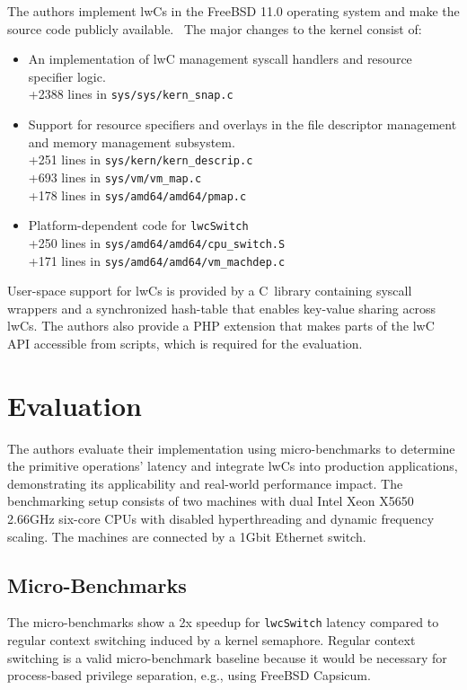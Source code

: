 \documentclass[10pt,twocolumn,a4paper]{article}
\begin{document}
The authors implement lwCs in the FreeBSD 11.0 operating system and make the source code publicly available.~\cite{lwckernelrepo,lwclibsrepo} %
The major changes to the kernel consist of:
\begin{itemize}[nosep]
  \item An implementation of lwC management syscall handlers and resource specifier logic.\\
  +2388 lines in \texttt{sys/sys/kern\_snap.c}
  \item Support for resource specifiers and overlays in the file descriptor management and memory management subsystem.\\
  +251 lines in \texttt{sys/kern/kern\_descrip.c}\\
  +693 lines in \texttt{sys/vm/vm\_map.c}\\
  +178 lines in \texttt{sys/amd64/amd64/pmap.c}
  \item Platform-dependent code for \lstinline{lwcSwitch}\\
  +250 lines in \texttt{sys/amd64/amd64/cpu\_switch.S}\\
  +171 lines in \texttt{sys/amd64/amd64/vm\_machdep.c}
\end{itemize}

User-space support for lwCs is provided by a C~library containing syscall wrappers and a synchronized hash-table that enables key-value sharing across lwCs.
The authors also provide a PHP extension that makes parts of the lwC API accessible from scripts, which is required for the evaluation.

\section{Evaluation}\label{eval}
The authors evaluate their implementation using micro-benchmarks to determine the primitive operations' latency
and integrate lwCs into production applications, demonstrating its applicability and real-world performance impact.
The benchmarking setup consists of two machines with dual Intel Xeon X5650 2.66GHz six-core CPUs with disabled hyperthreading and dynamic frequency scaling.
The machines are connected by a 1Gbit Ethernet switch.
\cite{lwcpaper}

\subsection{Micro-Benchmarks}
The micro-benchmarks show a 2x speedup for \lstinline{lwcSwitch} latency compared to regular context switching induced by a kernel semaphore.
Regular context switching is a valid micro-benchmark baseline because it would be necessary for process-based privilege separation, e.g., using FreeBSD Capsicum.
\cite{lwcpaper}
\end{document}
